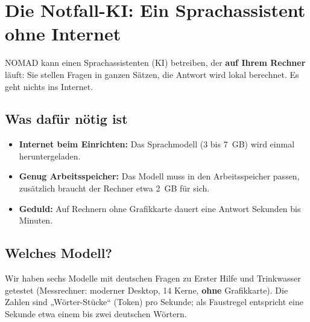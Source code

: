 \chapter{Die Notfall-KI: Ein Sprachassistent ohne Internet}

NOMAD kann einen Sprachassistenten (KI) betreiben, der \textbf{auf Ihrem Rechner} läuft: Sie stellen Fragen in ganzen Sätzen, die Antwort wird lokal berechnet. Es geht nichts ins Internet.


\section{Was dafür nötig ist}
\begin{itemize}[leftmargin=1.5em,itemsep=3pt]
\item \textbf{Internet beim Einrichten:} Das Sprachmodell (3 bis 7~GB) wird einmal heruntergeladen.
\item \textbf{Genug Arbeitsspeicher:} Das Modell muss in den Arbeitsspeicher passen, zusätzlich braucht der Rechner etwa 2~GB für sich.
\item \textbf{Geduld:} Auf Rechnern ohne Grafikkarte dauert eine Antwort Sekunden bis Minuten.
\end{itemize}

\section{Welches Modell?}
Wir haben sechs Modelle mit deutschen Fragen zu Erster Hilfe und Trinkwasser getestet (Messrechner: moderner Desktop, 14 Kerne, \textbf{ohne} Grafikkarte). Die Zahlen sind „Wörter-Stücke“ (Token) pro Sekunde; als Faustregel entspricht eine Sekunde etwa einem bis zwei deutschen Wörtern.

